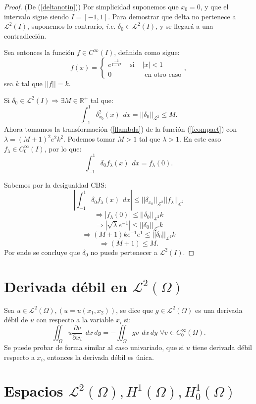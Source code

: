 \documentclass[12pt,spanish,oneside]{book}
\theoremstyle{plain}
\numberwithin{equation}{chapter}
\theoremstyle{definition}
\theoremstyle{remark}
\newcommand{\re}{\mathbb{R}}
\newcommand{\parc}[2]{\frac{\partial #1}{\partial #2}}
\newcommand{\LD}{\mathcal{L}^2}
\newcommand{\cz}{C_{\scriptscriptstyle{0}}^{\scriptscriptstyle{\infty}}}
\newcommand{\ci}{C^{\scriptscriptstyle{\infty}}}
\newcommand{\hu}{H^1}
\newcommand{\hcu}{H_0^1}
\newcommand{\dxy}{\hspace{5pt} dx\hspace{2pt} dy }
\newcommand{\dx}{\hspace{5pt} dx}
\newcommand{\intomega}[1]{\iint_\Omega #1 \dxy} %
\begin{document}
\begin{proof}
(De (\ref{deltanotin})) Por simplicidad suponemos que $x_0=0$, y que el intervalo sigue siendo $I=[-1,1]$. Para demostrar que delta no pertenece a $\LD(I)$, suponemos lo contrario, \textit{i.e.} $\delta_0\in\LD(I)$, y se llegará a una contradicción.

Sea entonces la función $f\in \ci(I)$, definida como sigue:
\begin{equation} 
f(x)=\left \lbrace \begin{array}{ccc} e^{\frac{-1}{1-x^{2}}} &\text{ si } & |x|<1 \\ 0 & & \text{ en otro caso} \end{array}\right.,\label{fcompact}
\end{equation}
sea $k$ tal que $||f||=k$.

Si $\delta_{0}\in\LD(I)\Rightarrow\exists M\in\re^{+}$ tal que: \[\int_{-1}^1\delta_{x_0}^2(x)\dx=||\delta_{0}||_{\LD}\leq M.\] 
Ahora tomamos la transformación (\ref{flambda}) de la función (\ref{fcompact}) con $\lambda=(M+1)^2e^{2}k^2$. Podemos tomar $M>1$ tal que $\lambda>1$. En este caso $f_{\lambda}\in \cz(I) $, por lo que: 
\[\int_{-1}^1\delta_0f_{\lambda}(x)\dx = f_{\lambda}(0).\]

Sabemos por la desigualdad CBS:
\[\left|\int_{-1}^1 \delta_{0} f_{\lambda}(x)\dx\right|\leq ||\delta_{x_0}||_{\mathcal{L}^2}||f_{\lambda}||_{\mathcal{L}^2} \]
\[\Rightarrow |f_{\lambda}(0)| \leq ||\delta_{0}||_{\LD}k \]
\[\Rightarrow |\sqrt{\lambda}e^{-1}| \leq ||\delta_{0}||_{\LD}k \]
\[\Rightarrow (M+1)ke^{-1}e^{1}\leq ||\delta_{0}||_{\LD} k \]
\[\Rightarrow (M+1)\leq M. \]
Por ende se concluye que $\delta_0$ no puede pertenecer a $\LD(I)$.
\end{proof}

\section{Derivada débil en $\LD(\Omega)$}

Sea $u\in\LD(\Omega),(u=u(x_1,x_2))$, se dice que $g\in\LD(\Omega)$ es una derivada débil de $u$ con respecto a la variable $x_i$ si:
\[\intomega{u \parc{v}{x_i}}=-\intomega {g v}\hspace{4pt} \forall v\in \cz(\Omega).\]
Se puede probar de forma similar al caso univariado, que si $u$ tiene derivada débil respecto a $x_i$, entonces la derivada débil es única.

\section{Espacios $\LD(\Omega),\hu(\Omega),\hcu(\Omega)$}
\end{document}
